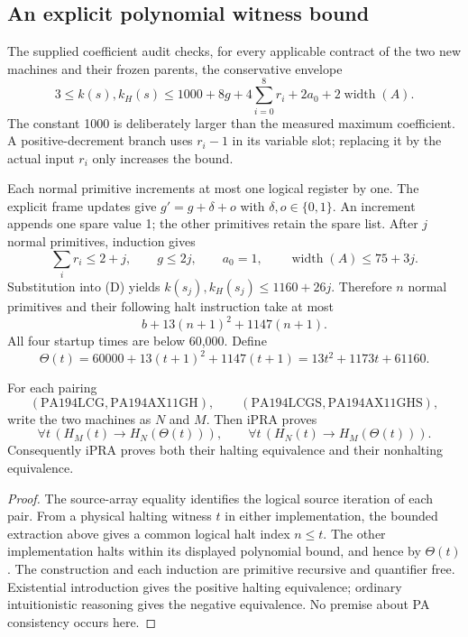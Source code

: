 \subsection{An explicit polynomial witness bound}
The supplied coefficient audit checks, for every applicable contract of
the two new machines and their frozen parents, the conservative envelope
\[
3\le k(s),k_H(s)\le
1000+8g+4\sum_{i=0}^{8}r_i+2a_0+2\operatorname{width}(A).
\tag{D}
\]
The constant 1000 is deliberately larger than the measured maximum
coefficient. A positive-decrement branch uses $r_i-1$ in its variable
slot; replacing it by the actual input $r_i$ only increases the bound.

Each normal primitive increments at most one logical register by one.
The explicit frame updates give $g'=g+\delta+o$ with
$\delta,o\in\{0,1\}$. An increment appends one spare value 1; the other
primitives retain the spare list. After $j$ normal primitives, induction gives
\[
\sum_i r_i\le2+j,\qquad g\le2j,\qquad
 a_0=1,\qquad\operatorname{width}(A)\le75+3j.
\]
Substitution into (D) yields $k(s_j),k_H(s_j)\le1160+26j$.
Therefore $n$ normal primitives and their following halt instruction take
at most
\[
b+13(n+1)^2+1147(n+1).
\]
All four startup times are below 60,000. Define
\[
\boxed{\Theta(t)=60000+13(t+1)^2+1147(t+1)
                  =13t^2+1173t+61160.}
\]

\begin{theorem}
For each pairing
\[
(\mathrm{PA194LCG},\mathrm{PA194AX11GH}),\qquad
(\mathrm{PA194LCGS},\mathrm{PA194AX11GHS}),
\]
write the two machines as $N$ and $M$. Then iPRA proves
\[
\forall t\,(H_M(t)\to H_N(\Theta(t))),\qquad
\forall t\,(H_N(t)\to H_M(\Theta(t))).
\]
Consequently iPRA proves both their halting equivalence and their
nonhalting equivalence.
\end{theorem}
\begin{proof}
The source-array equality identifies the logical source iteration of
each pair. From a physical halting witness $t$ in either implementation,
the bounded extraction above gives a common logical halt index $n\le t$.
The other implementation halts within its displayed polynomial bound,
and hence by $\Theta(t)$. The construction and each induction are
primitive recursive and quantifier free. Existential introduction gives
the positive halting equivalence; ordinary intuitionistic reasoning gives
the negative equivalence. No premise about PA consistency occurs here.
\end{proof}
